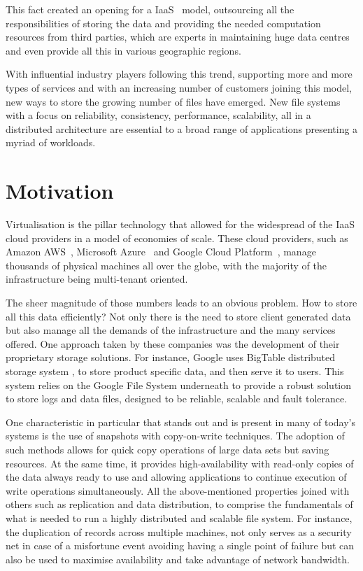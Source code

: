 This fact created an opening for a \gls{IaaS}~\cite{Mell2011} model, outsourcing all the responsibilities of storing the data and providing the needed computation resources from third parties, which are experts in maintaining huge data centres and even provide all this in various geographic regions.

With influential industry players following this trend, supporting more and more types of services and with an increasing number of customers joining this model, new ways to store the growing number of files have emerged. New file systems with a focus on reliability, consistency, performance, scalability, all in a distributed architecture are essential to a broad range of applications presenting a myriad of workloads.



\section{Motivation} %
\label{sec:motivation}

Virtualisation is the pillar technology that allowed for the widespread of the IaaS cloud providers in a model of economies of scale. These cloud providers, such as Amazon AWS~\cite{aws_2017}, Microsoft Azure~\cite{azure_2017} and Google Cloud Platform~\cite{gcp_2017}, manage thousands of physical machines all over the globe, with the majority of the infrastructure being multi-tenant oriented. 

The sheer magnitude of those numbers leads to an obvious problem. How to store all this data efficiently? Not only there is the need to store client generated data but also manage all the demands of the infrastructure and the many services offered. One approach taken by these companies was the development of their proprietary storage solutions. For instance, Google uses BigTable distributed storage system \cite{Chang2006}, to store product specific data, and then serve it to users. This system relies on the Google File System underneath to provide a robust solution to store logs and data files, designed to be reliable, scalable and fault tolerance.

One characteristic in particular that stands out and is present in many of today's systems is the use of snapshots with copy-on-write techniques. The adoption of such methods allows for quick copy operations of large data sets but saving resources. At the same time, it provides high-availability with read-only copies of the data always ready to use and allowing applications to continue execution of write operations simultaneously.
All the above-mentioned properties joined with others such as replication and data distribution, to comprise the fundamentals of what is needed to run a highly distributed and scalable file system. For instance, the duplication of records across multiple machines, not only serves as a security net in case of a misfortune event avoiding having a single point of failure but can also be used to maximise availability and take advantage of network bandwidth. 

